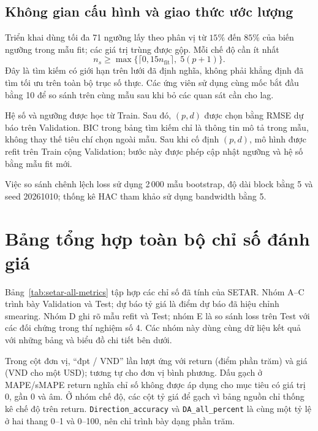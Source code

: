 \documentclass[a4paper,reqno,oneside]{book}
\numberwithin{equation}{chapter}
\begin{document}
\subsection{Không gian cấu hình và giao thức ước lượng}

Triển khai dùng tối đa 71 ngưỡng lấy theo phân vị từ $15\%$ đến $85\%$ của biến ngưỡng trong mẫu fit; các giá trị trùng được gộp. Mỗi chế độ cần ít nhất
\[
 n_s\geq\max\{\lceil0{,}15n_{\mathrm{fit}}\rceil,\;5(p+1)\}.
\]
Đây là tìm kiếm có giới hạn trên lưới đã định nghĩa, không phải khẳng định đã tìm tối ưu trên toàn bộ trục số thực. Các ứng viên sử dụng cùng mốc bắt đầu bằng 10 để so sánh trên cùng mẫu sau khi bỏ các quan sát cần cho lag.

Hệ số và ngưỡng được học từ Train. Sau đó, $(p,d)$ được chọn bằng RMSE dự báo trên Validation. BIC trong bảng tìm kiếm chỉ là thông tin mô tả trong mẫu, không thay thế tiêu chí chọn ngoài mẫu. Sau khi cố định $(p,d)$, mô hình được refit trên Train cộng Validation; bước này được phép cập nhật ngưỡng và hệ số bằng mẫu fit mới.

Việc so sánh chênh lệch loss sử dụng 2\,000 mẫu bootstrap, độ dài block bằng 5 và seed 20261010; thống kê HAC tham khảo sử dụng bandwidth bằng 5.

\section{Bảng tổng hợp toàn bộ chỉ số đánh giá}

Bảng~\ref{tab:setar-all-metrics} tập hợp các chỉ số đã tính của SETAR. Nhóm A--C trình bày Validation và Test; dự báo tỷ giá là điểm dự báo đã hiệu chỉnh smearing. Nhóm D ghi rõ mẫu refit và Test; nhóm E là so sánh loss trên Test với các đối chứng trong thí nghiệm số 4. Các nhóm này dùng cùng dữ liệu kết quả với những bảng và biểu đồ chi tiết bên dưới.

Trong cột đơn vị, ``đpt / VND'' lần lượt ứng với return (điểm phần trăm) và giá (VND cho một USD); tương tự cho đơn vị bình phương. Dấu gạch ở MAPE/sMAPE return nghĩa chỉ số không được áp dụng cho mục tiêu có giá trị 0, gần 0 và âm. Ở nhóm chế độ, các cột tỷ giá để gạch vì bảng nguồn chỉ thống kê chế độ trên return. \texttt{Direction\_accuracy} và \texttt{DA\_all\_percent} là cùng một tỷ lệ ở hai thang 0--1 và 0--100, nên chỉ trình bày dạng phần trăm.
\end{document}
